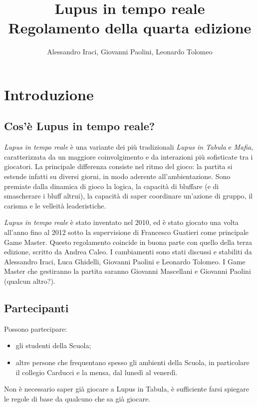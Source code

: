 \documentclass[a4paper,10pt]{article}
\title{Lupus in tempo reale\\ Regolamento della quarta edizione}
\author{Alessandro Iraci, Giovanni Paolini, Leonardo Tolomeo}
\begin{document}
\maketitle


\section{Introduzione}

\subsection{Cos'è Lupus in tempo reale?}

\emph{Lupus in tempo reale} è una variante dei più tradizionali \emph{Lupus in Tabula} e \emph{Mafia}, caratterizzata da un maggiore coinvolgimento e da interazioni più sofisticate tra i giocatori.
La principale differenza consiste nel ritmo del gioco: la partita si estende infatti su diversi giorni, in modo aderente all'ambientazione.
Sono premiate dalla dinamica di gioco la logica, la capacità di bluffare (e di smascherare i bluff altrui), la capacità di saper coordinare un’azione di gruppo, il carisma e le velleità leaderistiche.

\emph{Lupus in tempo reale} è stato inventato nel 2010, ed è stato giocato una volta all'anno fino al 2012 sotto la supervisione di Francesco Guatieri come principale Game Master.
Questo regolamento coincide in buona parte con quello della terza edizione, scritto da Andrea Caleo.
I cambiamenti sono stati discussi e stabiliti da Alessandro Iraci, Luca Ghidelli, Giovanni Paolini e Leonardo Tolomeo.
I Game Master che gestiranno la partita saranno Giovanni Mascellani e Giovanni Paolini (qualcun altro?).


\subsection{Partecipanti}

Possono partecipare:
\begin{itemize}
 \item gli studenti della Scuola;
 \item altre persone che frequentano spesso gli ambienti della Scuola, in particolare il collegio Carducci e la mensa, dal lunedì al venerdì.
\end{itemize}

Non è necessario saper già giocare a Lupus in Tabula, è sufficiente farsi spiegare le regole di base da qualcuno che sa già giocare.
\end{document}
